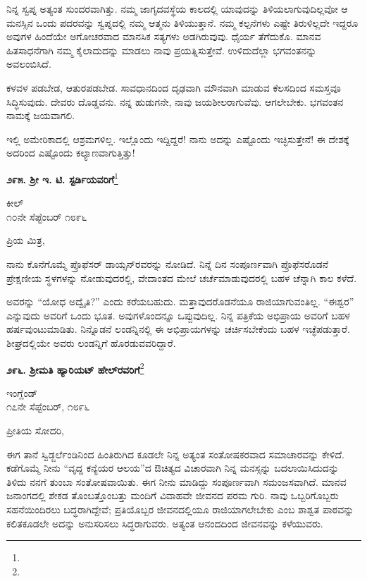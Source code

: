ನಿನ್ನ ಸ್ವಪ್ನ ಅತ್ಯಂತ ಸುಂದರವಾಗಿತ್ತು. ನಮ್ಮ ಜಾಗೃದವಸ್ಥೆಯ ಕಾಲದಲ್ಲಿ ಯಾವುದನ್ನು ತಿಳಿಯಲಾಗುವುದಿಲ್ಲವೋ ಆ ಮನಸ್ಸಿನ ಒಂದು ಪದರವನ್ನು ಸ್ವಪ್ನದಲ್ಲಿ ನಮ್ಮ ಆತ್ಮನು ತಿಳಿಯುತ್ತಾನೆ. ನಮ್ಮ ಕಲ್ಪನೆಗಳು ಎಷ್ಟೇ ತಿರುಳಿಲ್ಲದೇ ಇದ್ದರೂ ಅವುಗಳ ಹಿಂದೆಯೇ ಅಗೋಚರವಾದ ಮಾನಸಿಕ ಸತ್ಯಗಳು ಅಡಗಿರುವುವು. ಧೈರ್ಯ ತೆಗೆದುಕೊ. ಮಾನವ ಹಿತಸಾಧನೆಗಾಗಿ ನಮ್ಮ ಕೈಲಾದುದನ್ನು ಮಾಡಲು ನಾವು ಪ್ರಯತ್ನಿಸುತ್ತೇವೆ. ಉಳಿದುದೆಲ್ಲಾ ಭಗವಂತನನ್ನು ಅವಲಂಬಿಸಿದೆ.

ಕಳವಳ ಪಡಬೇಡ, ಆತುರಪಡಬೇಡ. ಸಾವಧಾನದಿಂದ ದೃಢವಾಗಿ ಮೌನವಾಗಿ ಮಾಡುವ ಕೆಲಸದಿಂದ ಸಮಸ್ತವೂ ಸಿದ್ಧಿಸುವುದು. ದೇವರು ದೊಡ್ಡವನು. ನನ್ನ ಹುಡುಗನೇ, ನಾವು ಜಯಶೀಲರಾಗುವೆವು. ಆಗಲೇಬೇಕು. ಭಗವಂತನ ನಾಮಕ್ಕೆ ಜಯವಾಗಲಿ.

ಇಲ್ಲಿ ಅಮೇರಿಕಾದಲ್ಲಿ ಆಶ್ರಮಗಳಿಲ್ಲ. ಇಲ್ಲೊಂದು ಇದ್ದಿದ್ದರೆ! ನಾನು ಅದನ್ನು ಎಷ್ಟೊಂದು ಇಚ್ಛಿಸುತ್ತೇನೆ! ಈ ದೇಶಕ್ಕೆ ಅದರಿಂದ ಎಷ್ಟೊಂದು ಕಲ್ಯಾಣವಾಗುತ್ತಿತ್ತು!
\vspace{-0.2cm}

\begin{center}
\textbf{೨೯೫. ಶ‍್ರೀ ಇ. ಟಿ. ಸ್ಟರ್ಡಿಯವರಿಗೆ}\footnote{}
\end{center}
\vspace{-0.5cm}

\begin{flushright}
ಕೀಲ್\\೧೦ನೇ ಸೆಪ್ಟೆಂಬರ್ ೧೮೯೬
\end{flushright}
\vspace{-0.4cm}

\noindent
ಪ್ರಿಯ ಮಿತ್ರ,

ನಾನು ಕೊನೆಗೊಮ್ಮೆ ಪ್ರೊಫೆಸರ್ ಡಾಯ್ಸನ್‌ರವರನ್ನು ನೋಡಿದೆ. ನಿನ್ನೆ ದಿನ ಸಂಪೂರ್ಣವಾಗಿ ಪ್ರೊಫೆಸರೊಡನೆ ಪ್ರೇಕ್ಷಣೀಯ ಸ್ಥಳಗಳನ್ನು ನೋಡುವುದರಲ್ಲಿ, ವೇದಾಂತದ ಮೇಲೆ ಚರ್ಚೆಮಾಡುವುದರಲ್ಲಿ ಬಹಳ ಚೆನ್ನಾಗಿ ಕಾಲ ಕಳೆದೆ.

ಅವರನ್ನು “ಯೋಧ ಅದ್ವೈತಿ?” ಎಂದು ಕರೆಯಬಹುದು. ಮತ್ತಾವುದರೊಡನೆಯೂ ರಾಜಿಯಾಗುವಂತಿಲ್ಲ. “ಈಶ್ವರ” ಎನ್ನುವುದು ಅವರಿಗೆ ಒಂದು ಭೂತ. ಅವುಗಳೊಂದನ್ನೂ ಒಪ್ಪುವುದಿಲ್ಲ. ನಿನ್ನ ಪತ್ರಿಕೆಯ ಅಭಿಪ್ರಾಯ ಅವರಿಗೆ ಬಹಳ ಹರ್ಷವುಂಟುಮಾಡಿತು. ನಿನ್ನೊಡನೆ ಲಂಡನ್ನಿನಲ್ಲಿ ಈ ಅಭಿಪ್ರಾಯಗಳನ್ನು ಚರ್ಚಿಸಬೇಕೆಂದು ಬಹಳ ಇಚ್ಛೆಪಡುತ್ತಾರೆ. ಶೀಘ್ರದಲ್ಲಿಯೇ ಅವರು ಲಂಡನ್ನಿಗೆ ಹೊರಡುವವರಿದ್ದಾರೆ.

\begin{center}
\textbf{೨೯೬. ಶ‍್ರೀಮತಿ ಹ್ಯಾರಿಯಟ್ ಹೇಲ್‌ರವರಿಗೆ}\footnote{}
\end{center}

\begin{flushright}
ಇಂಗ್ಲೆಂಡ್\\೧೭ನೇ ಸೆಪ್ಟೆಂಬರ್, ೧೮೯೬
\end{flushright}

\noindent
ಪ್ರೀತಿಯ ಸೋದರಿ,

ಈಗ ತಾನೆ ಸ್ವಿಡ್ಜರ್ಲೆಂಡಿನಿಂದ ಹಿಂತಿರುಗಿದ ಕೂಡಲೇ ನಿನ್ನ ಅತ್ಯಂತ ಸಂತೋಷಕರವಾದ ಸಮಾಚಾರವನ್ನು ಕೇಳಿದೆ. ಕಡೆಗೊಮ್ಮೆ ನೀನು “ವೃದ್ದ ಕನ್ಯೆಯರ ಆಲಯ”ದ ಔಚಿತ್ಯದ ವಿಚಾರವಾಗಿ ನಿನ್ನ ಮನಸ್ಸನ್ನು ಬದಲಾಯಿಸಿದುದನ್ನು ತಿಳಿದು ನನಗೆ ತುಂಬಾ ಸಂತೋಷವಾಯಿತು. ಈಗ ನೀನು ಮಾಡಿದ್ದು ಸಂಪೂರ್ಣವಾಗಿ ಸಮಂಜಸವಾಗಿದೆ. ಮಾನವ ಜನಾಂಗದಲ್ಲಿ ಶೇಕಡ ತೊಂಬತ್ತೊಂಬತ್ತು ಮಂದಿಗೆ ವಿವಾಹವೇ ಜೀವನದ ಪರಮ ಗುರಿ. ನಾವು ಒಬ್ಬರಿಗೊಬ್ಬರು ಸಹನೆಯಿಂದಿರಲು ಬದ್ಧರಾಗಿದ್ದೇವೆ; ಪ್ರತಿಯೊಬ್ಬರ ಜೀವನದಲ್ಲಿಯೂ ರಾಜಿಯಾಗಲೇಬೇಕು\enginline{-} ಎಂಬ ಶಾಶ್ವತ ಪಾಠವನ್ನು ಕಲಿತಕೂಡಲೇ ಅದನ್ನು ಅನುಸರಿಸಲು ಸಿದ್ಧರಾಗುವರು. ಅತ್ಯಂತ ಆನಂದದಿಂದ ಜೀವನವನ್ನು ಕಳೆಯುವರು.

